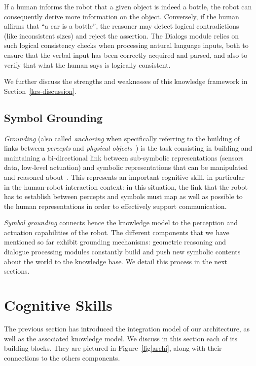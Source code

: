 \documentclass[preprint,3p,times]{elsarticle}
\begin{document}
If a human informs the robot that a given object is indeed a bottle, the robot
can consequently derive more information on the object. Conversely, if the human affirms that
``a car is a bottle'', the reasoner may detect logical contradictions (like
inconsistent sizes) and reject the assertion. The {\sc Dialogs} module relies
on such logical consistency checks when processing natural language inputs,
both to ensure that the verbal input has been correctly acquired and parsed,
and also to verify that what the human says is logically consistent.

We further discuss the strengths and weaknesses of this knowledge framework in
Section~\ref{krs-discussion}.

\subsection{Symbol Grounding}

\emph{Grounding} (also called \emph{anchoring} when specifically referring to
the building of links between \emph{percepts} and \emph{physical
objects}~\cite{Coradeschi2003}) is the task consisting in building and
maintaining a bi-directional link between sub-symbolic representations (sensors
data, low-level actuation) and symbolic representations that can be manipulated
and reasoned about~\cite{Harnad1990}. This represents an important cognitive
skill, in particular in the human-robot interaction context: in this situation, the
link that the robot has to establish between percepts and symbols must
map as well as possible to the human representations in order to effectively
support communication.

\emph{Symbol grounding} connects hence the knowledge model to the perception and
actuation capabilities of the robot. The different components that we have
mentioned so far exhibit grounding mechanisms: geometric reasoning and
dialogue processing modules constantly build and push new symbolic contents
about the world to the knowledge base. We detail this process in the next sections. 


\section{Cognitive Skills}
\label{sec:impl}

The previous section has introduced the integration model of our architecture,
as well as the associated knowledge model. We discuss in this section each of
its building blocks. They are pictured in Figure~\ref{fig|archi}, along with
their connections to the others components.
\end{document}
